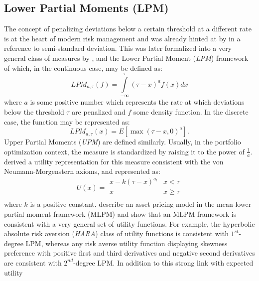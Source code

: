 \subsection{Lower Partial Moments (LPM)}\label{LPM}
The concept of penalizing deviations below a certain threshold at a different
rate is at the heart of modern risk management and was already hinted at by
\citet{Markowitz1952} in a reference to semi-standard deviation. This
was later formalized into a very general class of measures by
\citet{Stone1973}, and the Lower Partial Moment (\emph{LPM}) framework
of \citet{Fishburn1977} which, in the continuous case, may be defined
as:
\begin{equation}
LP{M_{a ,\tau }}\left( f \right)=\int\limits_{ - \infty }^\tau  {{{\left( {\tau  - x} \right)}^a }f\left( x \right)dx}
\end{equation}
where $a$ is some positive number which represents the rate at which deviations
below the threshold $\tau$ are penalized and $f$ some density function.
In the discrete case, the function may be represented as:
\begin{equation}
LP{M_{a ,\tau }}\left( x \right)=E\left[ {\max {{\left( {\tau  - x,0} \right)}^a}} \right].
\end{equation}
Upper Partial Moments (\emph{UPM}) are defined similarly. Usually, in the
portfolio optimization context, the measure is standardized by raising it to
the power of $\frac{1}{a}$. \citet{Fishburn1977} derived a utility
representation for this measure consistent with the von Neumann-Morgenstern
axioms, and represented as:
\begin{equation}\label{eq:lpmutility}
U\left( x \right)=\begin{array}{*{20}{c}}
   {x - {k}{{\left( {\tau  - x} \right)}^{{a_l}}}} & {x < \tau }  \\
   x & {x \geq \tau }  \\
\end{array}
\end{equation}
where $k$ is a positive constant. \citet{Harlow1989} describe an asset
pricing model in the mean-lower partial moment framework (MLPM) and show that
an MLPM framework is consistent with a very general set of utility functions.
For example, the hyperbolic absolute risk aversion (\emph{HARA}) class of
utility functions  is consistent with $1^{st}$-degree LPM, whereas any risk
averse utility function displaying skewness preference with positive first
and third derivatives and negative second derivatives are consistent with
$2^{nd}$-degree LPM. In addition to this strong link with expected utility
